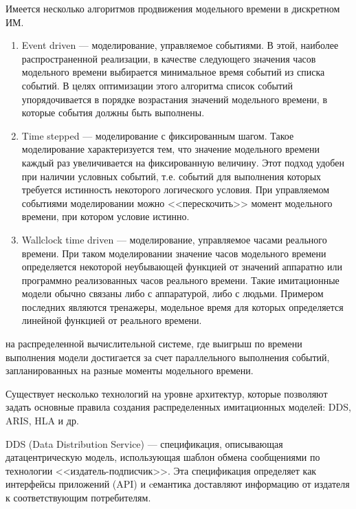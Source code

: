 Имеется несколько алгоритмов продвижения модельного времени в дискретном ИМ.
\begin{enumerate}
\item Event driven --- моделирование, управляемое событиями. В этой, наиболее распространенной реализации, в качестве следующего значения часов модельного времени выбирается минимальное время событий из списка событий. В целях оптимизации этого алгоритма список событий упорядочивается в порядке возрастания значений модельного времени, в которые события должны быть выполнены.
\item Time stepped --- моделирование с фиксированным шагом. Такое моделирование характеризуется тем, что значение модельного времени каждый раз увеличивается на фиксированную величину. Этот подход удобен при наличии условных событий, т.е. событий для выполнения которых требуется истинность некоторого логического условия. При управляемом событиями моделировании можно <<перескочить>> момент модельного времени, при котором условие истинно.
\item Wallclock time driven --- моделирование, управляемое часами реального времени. При таком моделировании значение часов модельного времени определяется некоторой неубывающей функцией от значений аппаратно или программно реализованных часов реального времени. Такие имитационные модели обычно связаны либо с аппаратурой, либо с людьми. Примером последних являются тренажеры, модельное время для которых определяется линейной функцией от реального времени.	
\end{enumerate}

 на распределенной вычислительной системе, где выигрыш по времени выполнения модели достигается за счет параллельного выполнения событий, запланированных на разные моменты модельного времени.




Существует несколько технологий на уровне архитектур, которые позволяют задать основные правила создания распределенных имитационных моделей: DDS, ARIS, HLA и др.


DDS (Data Distribution Service)  --- спецификация, описывающая датацентрическую модель, использующая шаблон обмена сообщениями по технологии <<издатель-подписчик>>. Эта спецификация определяет как интерфейсы приложений (API) и cемантика доставляют информацию от издателя к соответствующим потребителям.

